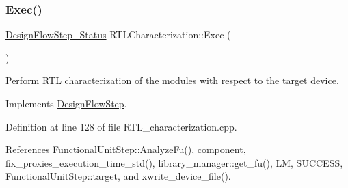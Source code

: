 \subsubsection{\texorpdfstring{Exec()}{Exec()}}
{\footnotesize\ttfamily \hyperlink{design__flow__step_8hpp_afb1f0d73069c26076b8d31dbc8ebecdf}{Design\+Flow\+Step\+\_\+\+Status} R\+T\+L\+Characterization\+::\+Exec (\begin{DoxyParamCaption}{ }\end{DoxyParamCaption})\hspace{0.3cm}{\ttfamily [virtual]}}



Perform R\+TL characterization of the modules with respect to the target device. 



Implements \hyperlink{classDesignFlowStep_a77d7e38493016766098711ea24f60b89}{Design\+Flow\+Step}.



Definition at line 128 of file R\+T\+L\+\_\+characterization.\+cpp.



References Functional\+Unit\+Step\+::\+Analyze\+Fu(), component, fix\+\_\+proxies\+\_\+execution\+\_\+time\+\_\+std(), library\+\_\+manager\+::get\+\_\+fu(), LM, S\+U\+C\+C\+E\+SS, Functional\+Unit\+Step\+::target, and xwrite\+\_\+device\+\_\+file().

